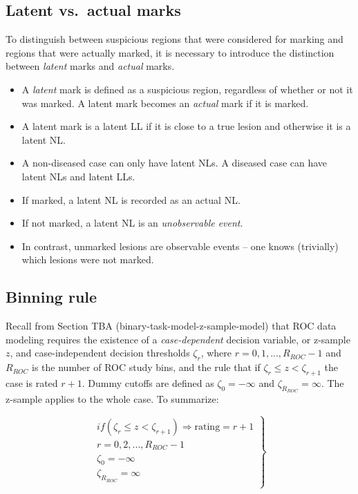 \documentclass[
]{book}
\providecommand{\tightlist}{%
  \setlength{\itemsep}{0pt}\setlength{\parskip}{0pt}}
\begin{document}
\hypertarget{latent-vs.-actual-marks}{%
\subsection{Latent vs.~actual marks}\label{latent-vs.-actual-marks}}

To distinguish between suspicious regions that were considered for marking and regions that were actually marked, it is necessary to introduce the distinction between \emph{latent} marks and \emph{actual} marks.

\begin{itemize}
\tightlist
\item
  A \emph{latent} mark is defined as a suspicious region, regardless of whether or not it was marked. A latent mark becomes an \emph{actual} mark if it is marked.
\item
  A latent mark is a latent LL if it is close to a true lesion and otherwise it is a latent NL.
\item
  A non-diseased case can only have latent NLs. A diseased case can have latent NLs and latent LLs.
\item
  If marked, a latent NL is recorded as an actual NL.
\item
  If not marked, a latent NL is an \emph{unobservable event}.
\item
  In contrast, unmarked lesions are observable events -- one knows (trivially) which lesions were not marked.
\end{itemize}

\hypertarget{binning-rule}{%
\subsection{Binning rule}\label{binning-rule}}

Recall from Section TBA (binary-task-model-z-sample-model) that ROC data modeling requires the existence of a \emph{case-dependent} decision variable, or z-sample \(z\), and case-independent decision thresholds \(\zeta_r\), where \(r = 0, 1, ..., R_{ROC}-1\) and \(R_{ROC}\) is the number of ROC study bins, and the rule that if \(\zeta_r \leq z < \zeta_{r+1}\) the case is rated \(r + 1\). Dummy cutoffs are defined as \(\zeta_0 = -\infty\) and \(\zeta_{R_{ROC}} = \infty\). The z-sample applies to the whole case. To summarize:

\begin{equation}
\left.
\begin{aligned}  
if \left (\zeta_r \le z < \zeta_{r+1}  \right )\Rightarrow \text {rating} = r+1\\
r = 0, 2, ..., R_{ROC}-1\\
\zeta_0 = -\infty\\
\zeta_{R_{ROC}} = \infty\\
\end{aligned}
\right \}
\label{eq:froc-empirical-binning-rule-roc}
\end{equation}
\end{document}
